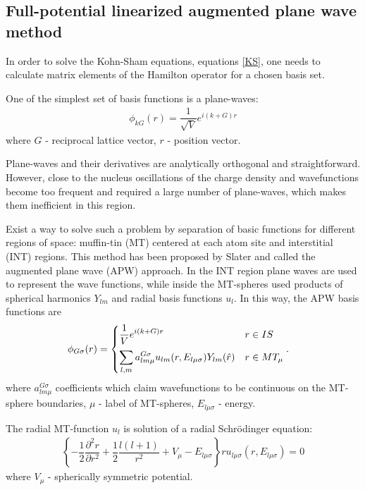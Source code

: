 \subsection{Full-potential linearized augmented plane wave method}

In order to solve the Kohn-Sham equations, equations \eqref{KS}, one needs to calculate matrix elements of the Hamilton operator for a chosen basis set.

One of the simplest set of basis functions is a plane-waves:
\begin{align}
\phi_{k G}(r)= \dfrac{1}{\sqrt{V}} e^{i(k+G)r}
\label{DFT_plane-waves}
\end{align}
where $G$ - reciprocal lattice vector, $r$ - position vector.

Plane-waves and their derivatives are analytically orthogonal and straightforward.
However, close to the nucleus oscillations of the charge density and wavefunctions become too frequent and required a large number of plane-waves, which makes them inefficient in this region.

Exist a way to solve such a problem by separation of basic functions for different regions of space: muffin-tin (MT) centered at each atom site and interstitial (INT) regions. This method has been proposed by Slater \citep{PhysRev.51.846,SLATER196435} and called the augmented plane wave (APW) approach.
In the INT region plane waves are used to represent the wave functions, while inside the MT-spheres used products of spherical harmonics $Y_{lm}$ and radial basis functions $u_l$.
In this way, the APW basis functions are
\begin{align}
\phi_{G \sigma}(r)
 &=
  \begin{cases}
   \vspace{.2cm}
   \displaystyle
   \dfrac{1}{V} e^{i(k+G)r}
   & r \in IS
   \\
   \displaystyle
   \sum_{l,m}a_{l m \mu}^{G \sigma} u_{l m} (r,E_{l \mu \sigma})Y_{l m} (\hat{r})
   & r \in MT_{\mu}
  \end{cases}.
\label{APW}
\end{align}
where $a_{l m \mu}^{G \sigma}$ coefficients which claim wavefunctions to be continuous on the MT-sphere boundaries, $\mu$ - label of MT-spheres, $E_{l \mu \sigma}$ - energy.

The radial MT-function $u_l$ is solution of a radial Schrödinger equation:
\begin{align}
\left\lbrace -\dfrac{1}{2} \dfrac{\partial^2 r}{\partial r^2} + \dfrac{1}{2} \dfrac{l(l+1)}{r^2} + V_{\mu} - E_{l \mu \sigma} \right\rbrace r u_{l \mu \sigma}(r,E_{l \mu \sigma})=0
\label{DFT_Sred_1}
\end{align}
where $V_{\mu}$ - spherically symmetric potential.


